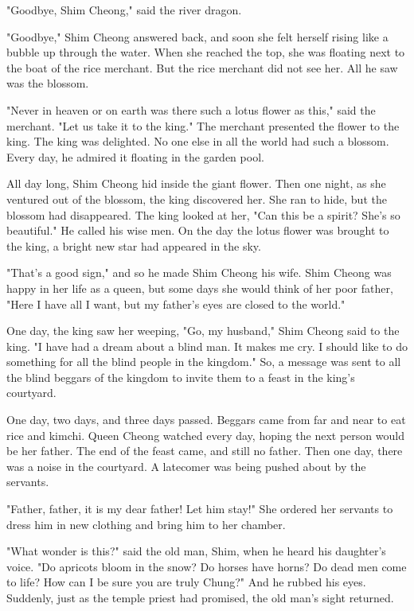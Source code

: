 "Goodbye, Shim Cheong," said the river dragon.

"Goodbye," Shim Cheong answered back, and soon she felt herself rising like a bubble up through the water. When she reached the top, she was floating next to the boat of the rice merchant. But the rice merchant did not see her. All he saw was the blossom.

"Never in heaven or on earth was there such a lotus flower as this," said the merchant. "Let us take it to the king." The merchant presented the flower to the king. The king was delighted. No one else in all the world had such a blossom. Every day, he admired it floating in the garden pool.

All day long, Shim Cheong hid inside the giant flower. Then one night, as she ventured out of the blossom, the king discovered her. She ran to hide, but the blossom had disappeared. The king looked at her, "Can this be a spirit? She's so beautiful." He called his wise men. On the day the lotus flower was brought to the king, a bright new star had appeared in the sky.

"That's a good sign," and so he made Shim Cheong his wife. Shim Cheong was happy in her life as a queen, but some days she would think of her poor father, "Here I have all I want, but my father's eyes are closed to the world."

One day, the king saw her weeping, "Go, my husband," Shim Cheong said to the king. "I have had a dream about a blind man. It makes me cry. I should like to do something for all the blind people in the kingdom." So, a message was sent to all the blind beggars of the kingdom to invite them to a feast in the king's courtyard.

One day, two days, and three days passed. Beggars came from far and near to eat rice and kimchi. Queen Cheong watched every day, hoping the next person would be her father. The end of the feast came, and still no father. Then one day, there was a noise in the courtyard. A latecomer was being pushed about by the servants.

"Father, father, it is my dear father! Let him stay!" She ordered her servants to dress him in new clothing and bring him to her chamber.

"What wonder is this?" said the old man, Shim, when he heard his daughter's voice. "Do apricots bloom in the snow? Do horses have horns? Do dead men come to life? How can I be sure you are truly Chung?" And he rubbed his eyes. Suddenly, just as the temple priest had promised, the old man's sight returned.

